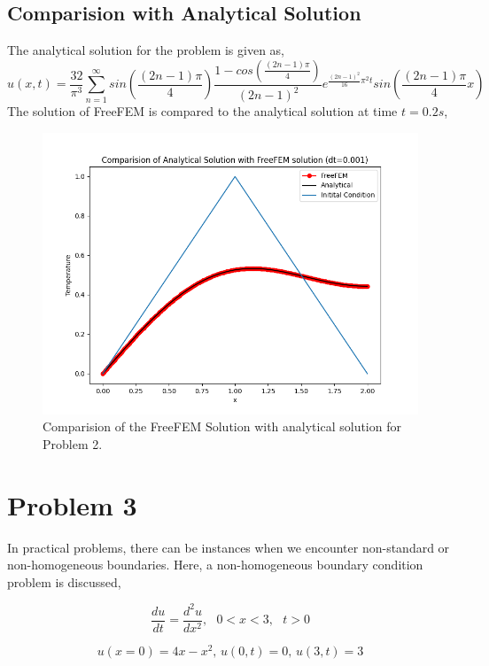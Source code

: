 \documentclass[11pt]{article} %
\begin{document}
\subsection{Comparision with Analytical Solution}
The analytical solution for the problem is given as,
\begin{equation}
u(x,t) = \frac{32}{\pi^3}\sum_{n=1}^{\infty}sin\left(\frac{(2n - 1)\pi}{4}\right)\frac{1 - cos\left(\frac{(2n - 1)\pi}{4}\right)}{(2n - 1)^2}e^{\frac{(2n-1)^2}{16}\pi^2 t}sin\left(\frac{(2n - 1)\pi}{4} x\right)
\end{equation}
 The solution of FreeFEM is compared to the analytical solution at time $t=0.2s$,
\begin{figure}[H]
\centering
\includegraphics[width=\textwidth]{figures/p22.png}
\caption{Comparision of the FreeFEM Solution with analytical solution for Problem 2.}
\end{figure}
\newpage
\section{Problem 3}
In practical problems, there can be instances when we encounter non-standard or non-homogeneous boundaries. Here, a non-homogeneous boundary condition problem is discussed,

\begin{equation}
\frac{du}{dt} = \frac{d^2u}{dx^2}, \text{ }0 < x < 3, \text{ }t>0
\end{equation}

\begin{equation}
u(x=0) = 4x-x^2 \text{,  } u(0,t) =0\text{, } u(3,t)=3 
\end{equation}
\end{document}
